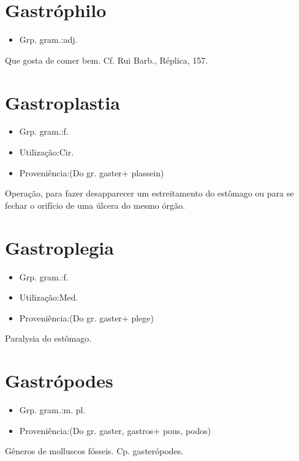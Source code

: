 \section{Gastróphilo}
\begin{itemize}
\item {Grp. gram.:adj.}
\end{itemize}
Que gosta de comer bem. Cf. Rui Barb., \textunderscore Réplica\textunderscore , 157.
\section{Gastroplastia}
\begin{itemize}
\item {Grp. gram.:f.}
\end{itemize}
\begin{itemize}
\item {Utilização:Cir.}
\end{itemize}
\begin{itemize}
\item {Proveniência:(Do gr. \textunderscore gaster\textunderscore  + \textunderscore plassein\textunderscore )}
\end{itemize}
Operação, para fazer desapparecer um estreitamento do estômago ou para se fechar o orifício de uma úlcera do mesmo órgão.
\section{Gastroplegia}
\begin{itemize}
\item {Grp. gram.:f.}
\end{itemize}
\begin{itemize}
\item {Utilização:Med.}
\end{itemize}
\begin{itemize}
\item {Proveniência:(Do gr. \textunderscore gaster\textunderscore  + \textunderscore plege\textunderscore )}
\end{itemize}
Paralysia do estômago.
\section{Gastrópodes}
\begin{itemize}
\item {Grp. gram.:m. pl.}
\end{itemize}
\begin{itemize}
\item {Proveniência:(Do gr. \textunderscore gaster\textunderscore , \textunderscore gastros\textunderscore  + \textunderscore pous\textunderscore , \textunderscore podos\textunderscore )}
\end{itemize}
Gêneros de molluscos fósseis. Cp. \textunderscore gasterópodes\textunderscore .
